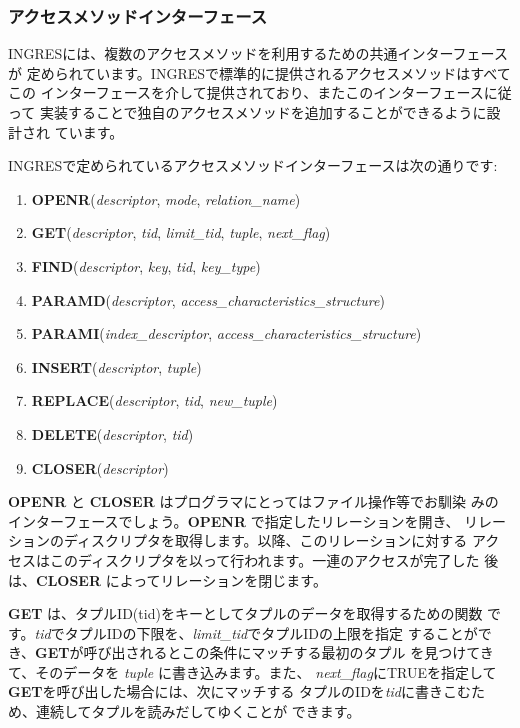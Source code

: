 \subsubsection{アクセスメソッドインターフェース}


INGRESには、複数のアクセスメソッドを利用するための共通インターフェースが
定められています。INGRESで標準的に提供されるアクセスメソッドはすべてこの
インターフェースを介して提供されており、またこのインターフェースに従って
実装することで独自のアクセスメソッドを追加することができるように設計され
ています。


INGRESで定められているアクセスメソッドインターフェースは次の通りです:
\begin{enumerate}
 \item {\bf OPENR}({\it descriptor}, {\it mode}, {\it relation\_name})
 \item {\bf GET}({\it descriptor}, {\it tid}, {\it limit\_tid}, {\it
       tuple}, {\it next\_flag})
 \item {\bf FIND}({\it descriptor}, {\it key}, {\it tid}, {\it key\_type})
 \item {\bf PARAMD}({\it descriptor}, {\it access\_characteristics\_structure})
 \item {\bf PARAMI}({\it index\_descriptor}, {\it access\_characteristics\_structure})
 \item {\bf INSERT}({\it descriptor}, {\it tuple})
 \item {\bf REPLACE}({\it descriptor}, {\it tid}, {\it new\_tuple})
 \item {\bf DELETE}({\it descriptor}, {\it tid})
 \item {\bf CLOSER}({\it descriptor})
\end{enumerate}
{\bf OPENR} と {\bf CLOSER} はプログラマにとってはファイル操作等でお馴染
みのインターフェースでしょう。{\bf OPENR} で指定したリレーションを開き、
リレーションのディスクリプタを取得します。以降、このリレーションに対する
アクセスはこのディスクリプタを以って行われます。一連のアクセスが完了した
後は、{\bf CLOSER} によってリレーションを閉じます。


{\bf GET} は、タプルID(tid)をキーとしてタプルのデータを取得するための関数
です。{\it tid}でタプルIDの下限を、{\it limit\_tid}でタプルIDの上限を指定
することができ、{\bf GET}が呼び出されるとこの条件にマッチする最初のタプル
を見つけてきて、そのデータを {\it tuple} に書き込みます。また、{\it
next\_flag}にTRUEを指定して{\bf GET}を呼び出した場合には、次にマッチする
タプルのIDを{\it tid}に書きこむため、連続してタプルを読みだしてゆくことが
できます。


